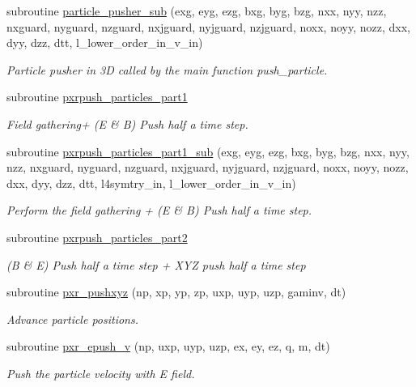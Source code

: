 \begin{DoxyCompactItemize}
subroutine \hyperlink{particles__push_8_f90_ab54fd25981abe6f64d5a146a1a933d24}{particle\+\_\+pusher\+\_\+sub} (exg, eyg, ezg, bxg, byg, bzg, nxx, nyy, nzz, nxguard, nyguard, nzguard, nxjguard, nyjguard, nzjguard, noxx, noyy, nozz, dxx, dyy, dzz, dtt, l\+\_\+lower\+\_\+order\+\_\+in\+\_\+v\+\_\+in)
\begin{DoxyCompactList}\small\item\em Particle pusher in 3D called by the main function push\+\_\+particle. \end{DoxyCompactList}\item 
subroutine \hyperlink{particles__push_8_f90_a1143d3843261bfef77dc0c9665e947d1}{pxrpush\+\_\+particles\+\_\+part1}
\begin{DoxyCompactList}\small\item\em Field gathering+ (E \& B) Push half a time step. \end{DoxyCompactList}\item 
subroutine \hyperlink{particles__push_8_f90_af540a0f57e31e83e106a01e492318462}{pxrpush\+\_\+particles\+\_\+part1\+\_\+sub} (exg, eyg, ezg, bxg, byg, bzg, nxx, nyy, nzz, nxguard, nyguard, nzguard, nxjguard, nyjguard, nzjguard, noxx, noyy, nozz, dxx, dyy, dzz, dtt, l4symtry\+\_\+in, l\+\_\+lower\+\_\+order\+\_\+in\+\_\+v\+\_\+in)
\begin{DoxyCompactList}\small\item\em Perform the field gathering + (E \& B) Push half a time step. \end{DoxyCompactList}\item 
subroutine \hyperlink{particles__push_8_f90_ab65aba49863198b09c221d6bf6a8f6bc}{pxrpush\+\_\+particles\+\_\+part2}
\begin{DoxyCompactList}\small\item\em (B \& E) Push half a time step + X\+YZ push half a time step \end{DoxyCompactList}\item 
subroutine \hyperlink{particles__push_8_f90_aa77ade6c16b80186ff4ba5e899c70848}{pxr\+\_\+pushxyz} (np, xp, yp, zp, uxp, uyp, uzp, gaminv, dt)
\begin{DoxyCompactList}\small\item\em Advance particle positions. \end{DoxyCompactList}\item 
subroutine \hyperlink{particles__push_8_f90_ad3b68e848193f6e2e6adb95490c79ea3}{pxr\+\_\+epush\+\_\+v} (np, uxp, uyp, uzp, ex, ey, ez, q, m, dt)
\begin{DoxyCompactList}\small\item\em Push the particle velocity with E field. \end{DoxyCompactList}\item 

\end{DoxyCompactItemize}
